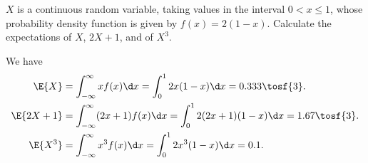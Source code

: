 \clearpage
\begin{problem}
    $X$ is a continuous random variable, taking values in the interval $0 < x \leq 1$, whose probability density function is given by $f(x) = 2(1 -x)$. Calculate the expectations of $X$, $2X + 1$, and of $X^3$.
\end{problem}
\begin{solution}
    We have
    \begin{align*}
        \E{X} &= \int_{-\infty}^\infty xf(x) \d x = \int_0^1 2x(1-x) \d x = 0.333 \tosf{3}.\\
        \E{2X+1} &= \int_{-\infty}^\infty (2x+1)f(x) \d x = \int_0^1 2(2x+1)(1-x) \d x = 1.67 \tosf{3}.\\
        \E{X^3} &= \int_{-\infty}^\infty x^3 f(x) \d x = \int_0^1 2x^3 (1-x) \d x = 0.1.
    \end{align*}
\end{solution}

